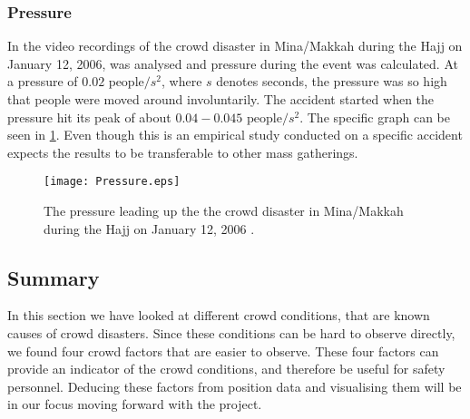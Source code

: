 
\subsubsection{Pressure}
In \citet{empircalstudy} the video recordings of the crowd disaster in Mina/Makkah during the Hajj on January 12, 2006, was analysed and pressure during the event was calculated. At a pressure of $0.02 \text{ people} / s^2$, where $s$ denotes seconds, the pressure was so high that people were moved around involuntarily. The accident started when the pressure hit its peak of about $0.04-0.045 \text{ people} / s^2$. The specific graph can be seen in \cref{mekkahCrowdDistaster206}. Even though this is an empirical study conducted on a specific accident \citeauthor{empircalstudy} expects the results to be transferable to other mass gatherings.

\begin{figure}
    \centering
    \texttt{[image: Pressure.eps]}
    \caption[The pressure leading up the the crowd disaster in Mina/Makkah]{The pressure leading up the the crowd disaster in Mina/Makkah during the Hajj on January 12, 2006 \cite{empircalstudy}.}
    \label{mekkahCrowdDistaster206}
\end{figure}

\subsection{Summary}\label{sec:crowd_conditions_summary}

In this section we have looked at different crowd conditions, that are known causes of crowd disasters. Since these conditions can be hard to observe directly, we found four crowd factors that are easier to observe. These four factors can provide an indicator of the crowd conditions, and therefore be useful for safety personnel. Deducing these factors from position data and visualising them will be in our focus moving forward with the project.